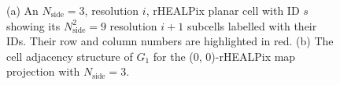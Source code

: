 \documentclass[12pt]{iopart}
\newcommand{\nside}{N_{\text{side}}}
\begin{document}
\begin{figure}[!htb]
\label{fig:children}

\caption{(a) An $\nside = 3$, resolution $i$, rHEALPix planar cell with ID $s$ showing its $\nside^2 = 9$ resolution $i + 1$ subcells labelled with their IDs. Their row and column numbers are highlighted in red.
(b) The cell adjacency structure of $G_1$ for the (0, 0)-rHEALPix map projection with $\nside = 3$.}
\end{figure}
\end{document}

